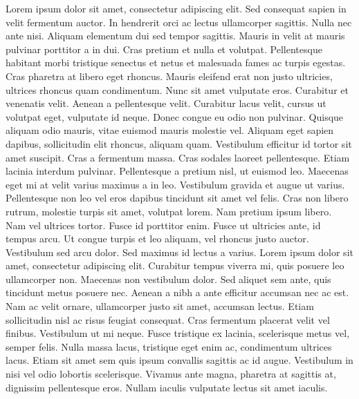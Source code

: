 \documentclass[./main.tex]{subfiles}
\begin{document}
\large

\newpage
\renewcommand{\headrulewidth}{0pt}
\thispagestyle{fancy}
\fancyhf{} %
\fancyfoot{} %
\fancyfoot[C]{\thepage}

\begin{center}
    \vspace{5mm}
\end{center}
\singlespacing
\normalsize
Lorem ipsum dolor sit amet, consectetur adipiscing elit. Sed consequat sapien in velit fermentum auctor. In hendrerit orci ac lectus ullamcorper sagittis. Nulla nec ante nisi. Aliquam elementum dui sed tempor sagittis. Mauris in velit at mauris pulvinar porttitor a in dui. Cras pretium et nulla et volutpat. Pellentesque habitant morbi tristique senectus et netus et malesuada fames ac turpis egestas. Cras pharetra at libero eget rhoncus. Mauris eleifend erat non justo ultricies, ultrices rhoncus quam condimentum. Nunc sit amet vulputate eros. Curabitur et venenatis velit. Aenean a pellentesque velit. Curabitur lacus velit, cursus ut volutpat eget, vulputate id neque. Donec congue eu odio non pulvinar. Quisque aliquam odio mauris, vitae euismod mauris molestie vel. Aliquam eget sapien dapibus, sollicitudin elit rhoncus, aliquam quam. Vestibulum efficitur id tortor sit amet suscipit. Cras a fermentum massa. Cras sodales laoreet pellentesque. Etiam lacinia interdum pulvinar. Pellentesque a pretium nisl, ut euismod leo. Maecenas eget mi at velit varius maximus a in leo. Vestibulum gravida et augue ut varius. Pellentesque non leo vel eros dapibus tincidunt sit amet vel felis. Cras non libero rutrum, molestie turpis sit amet, volutpat lorem. Nam pretium ipsum libero. Nam vel ultrices tortor. Fusce id porttitor enim. Fusce ut ultricies ante, id tempus arcu. Ut congue turpis et leo aliquam, vel rhoncus justo auctor. Vestibulum sed arcu dolor. Sed maximus id lectus a varius. Lorem ipsum dolor sit amet, consectetur adipiscing elit. Curabitur tempus viverra mi, quis posuere leo ullamcorper non. Maecenas non vestibulum dolor. Sed aliquet sem ante, quis tincidunt metus posuere nec. Aenean a nibh a ante efficitur accumsan nec ac est. Nam ac velit ornare, ullamcorper justo sit amet, accumsan lectus. Etiam sollicitudin nisl ac risus feugiat consequat. Cras fermentum placerat velit vel finibus. Vestibulum ut mi neque. Fusce tristique ex lacinia, scelerisque metus vel, semper felis. Nulla massa lacus, tristique eget enim ac, condimentum ultrices lacus. Etiam sit amet sem quis ipsum convallis sagittis ac id augue. Vestibulum in nisi vel odio lobortis scelerisque. Vivamus ante magna, pharetra at sagittis at, dignissim pellentesque eros. Nullam iaculis vulputate lectus sit amet iaculis.\\[2ex]
	
\end{document}
